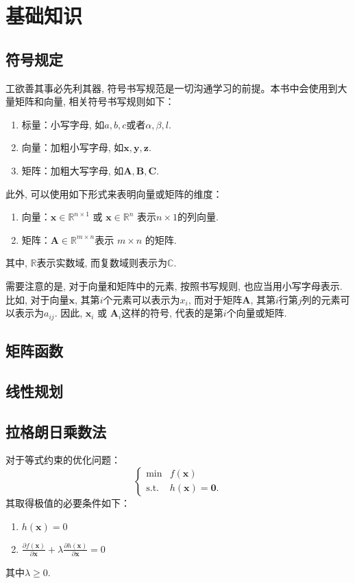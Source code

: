 \appendix
\chapter{基础知识}


\section{符号规定}

工欲善其事必先利其器, 符号书写规范是一切沟通学习的前提。本书中会使用到大量矩阵和向量, 相关符号书写规则如下：
\begin{enumerate}
    \item 标量：小写字母, 如$a,b,c$或者$\alpha, \beta, l$.
    \item 向量：加粗小写字母, 如$\bm{x},\bm{y},\bm{z}$.
    \item 矩阵：加粗大写字母, 如$\mathbf{A},\mathbf{B},\mathbf{C}$.
\end{enumerate}


此外, 可以使用如下形式来表明向量或矩阵的维度：
\begin{enumerate}
    \item 向量：$\bm{x} \in \mathbb{R}^{n \times 1}$ 或 $\bm{x} \in \mathbb{R}^{n}$ 表示\( n \times 1 \)的列向量.
    \item 矩阵：$\mathbf{A} \in \mathbb{R}^{m \times n}$表示 $m \times n$ 的矩阵.
\end{enumerate}
其中, $\mathbb{R}$表示实数域, 而复数域则表示为$\mathbb{C}$.

需要注意的是, 对于向量和矩阵中的元素, 按照书写规则, 也应当用小写字母表示. 比如, 对于向量$\bm{x}$, 其第$i$个元素可以表示为$x_i$, 而对于矩阵$\mathbf{A}$, 其第$i$行第$j$列的元素可以表示为$a_{ij}$. 因此, \( \bm{x}_i \) 或 \( \mathbf{A}_i \)这样的符号, 代表的是第\( i \)个向量或矩阵.


\section{矩阵函数}

\section{线性规划}


\section{拉格朗日乘数法}
对于等式约束的优化问题：
\[
    \begin{cases}
        \min          & f(\bm{x})           \\
        \mathrm{s.t.} & h(\bm{x}) = \bm{0}.
    \end{cases}
\]
其取得极值的必要条件如下：
\begin{enumerate}
    \item \( h(\bm{x}) = 0 \)
    \item \( \frac{\partial f(\bm{x})}{\partial \bm{x}} + \lambda \frac{\partial h(\bm{x})}{\partial \bm{x}} = 0 \)
\end{enumerate}
其中\( \lambda \geq 0 \).

